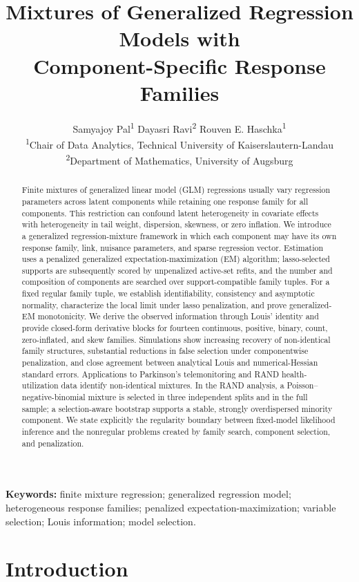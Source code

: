 \documentclass[11pt]{article}
\title{Mixtures of Generalized Regression Models with\\
Component-Specific Response Families}
\author{Samyajoy Pal\textsuperscript{1}\quad
Dayasri Ravi\textsuperscript{2}\quad
Rouven E. Haschka\textsuperscript{1}\\[0.75em]
\small \textsuperscript{1}Chair of Data Analytics, Technical University of Kaiserslautern-Landau\\
\small \textsuperscript{2}Department of Mathematics, University of Augsburg}
\date{}
\begin{document}
\maketitle

\begin{abstract}
Finite mixtures of generalized linear model (GLM) regressions usually vary regression
parameters across latent components while retaining one response family for all
components.  This restriction can confound latent heterogeneity in covariate
effects with heterogeneity in tail weight, dispersion, skewness, or zero
inflation.  We introduce a generalized regression-mixture framework in which each component
may have its own response family, link, nuisance parameters, and sparse
regression vector.  Estimation uses a penalized generalized
expectation-maximization (EM) algorithm; lasso-selected supports are
subsequently scored by unpenalized active-set refits, and the number and
composition of components are searched over support-compatible family tuples.
For a fixed
regular family tuple, we establish identifiability, consistency and asymptotic
normality, characterize the local limit under lasso penalization, and prove
generalized-EM monotonicity.  We derive the observed information through Louis' identity and
provide closed-form derivative blocks for fourteen continuous, positive,
binary, count, zero-inflated, and skew families.  Simulations show increasing
recovery of non-identical family structures, substantial reductions in false
selection under componentwise penalization, and close agreement between
analytical Louis and numerical-Hessian standard errors.  Applications to
Parkinson's telemonitoring and RAND health-utilization data identify
non-identical mixtures.  In the RAND analysis, a Poisson--negative-binomial
mixture is selected in three independent splits and in the full sample; a
selection-aware bootstrap supports a stable, strongly overdispersed minority
component.  We state explicitly the regularity boundary between fixed-model
likelihood inference and the nonregular problems created by family search,
component selection, and penalization.
\end{abstract}

\noindent\textbf{Keywords:} finite mixture regression; generalized regression
model; heterogeneous response families; penalized expectation-maximization;
variable selection; Louis information; model selection.

\section{Introduction}
\label{sec:introduction}
\end{document}
